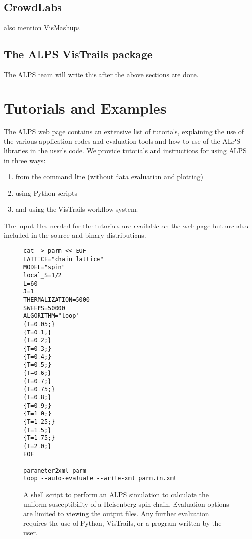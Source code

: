 \documentclass[12pt]{iopart}
\begin{document}
\subsection{CrowdLabs}
also mention VisMashups \cite{Santos09}
\subsection{The ALPS VisTrails package}
The ALPS team will write this after the above sections are done.
\section{Tutorials and Examples}

The ALPS web page \cite{alps} contains an extensive list of tutorials, explaining the use of the various application codes and evaluation tools and how to use of the ALPS libraries in the user's code. We provide tutorials and instructions for using ALPS in three ways: 
\begin{enumerate}
\item from the command line (without data evaluation and plotting)
\item using Python scripts
\item and using the VisTrails workflow system. 
\end{enumerate}

The input files needed for the tutorials are available on the web page but are also included in the source and binary distributions.

\begin{figure}
\begin{tiny}
\begin{center}
\begin{verbatim}
cat  > parm << EOF
LATTICE="chain lattice"
MODEL="spin"
local_S=1/2
L=60
J=1
THERMALIZATION=5000
SWEEPS=50000
ALGORITHM="loop"
{T=0.05;}
{T=0.1;}
{T=0.2;}
{T=0.3;}
{T=0.4;}
{T=0.5;}
{T=0.6;}
{T=0.7;}
{T=0.75;}
{T=0.8;}
{T=0.9;}
{T=1.0;}
{T=1.25;}
{T=1.5;}
{T=1.75;}
{T=2.0;}
EOF

parameter2xml parm
loop --auto-evaluate --write-xml parm.in.xml
\end{verbatim}
\end{center}
\end{tiny}
\caption{A shell script to perform an ALPS simulation to calculate the uniform susceptibility of a Heisenberg spin chain. Evaluation options are limited to viewing the output files. Any further evaluation requires the use of Python, VisTrails, or a program written by the user.}
\label{fig:commandline}
\end{figure}
\end{document}

